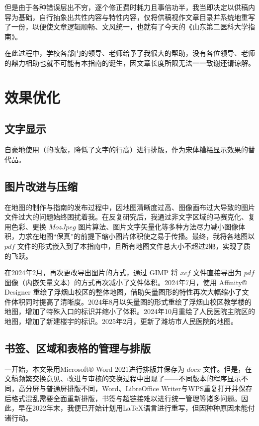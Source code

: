 但是由于各种错误层出不穷，逐个修正费时耗力且事倍功半，我当即决定以供稿内容为基础，自行抽象出共性内容与特性内容，仅将供稿视作文章目录并系统地重写了一份，以便使文章逻辑顺畅、文风统一，也就有了今天的《山东第二医科大学指南》。

在此过程中，学校各部门的领导、老师给予了我很大的帮助，没有各位领导、老师的鼎力相助也就不可能有本指南的诞生，因文章长度所限无法一一致谢还请谅解。

\section[效果优化]{效果优化}
\subsection[文字显示]{文字显示}
自豪地使用（的改版，降低了文字的行高）进行排版，作为宋体糟糕显示效果的替代品。

\subsection[图片改进与压缩]{图片改进与压缩}
在地图的制作与指南的发布过程中，因地图清晰度过高、图像画布过大导致的图片文件过大\footnotemark 的问题始终困扰着我。在反复研究后，我通过非文字区域的马赛克化、复用色彩、更换 $MozJpeg$ 图片算法、图片文字矢量化等多种方法尽力减小图像体积，力求在地图“保真”的前提下缩小图片体积使之易于传播。最终，我将各地图以 $pdf$ 文件的形式嵌入到了本指南中，且所有地图文件总大小不超过2㎆，实现了质的飞跃。

在2024年2月，再次更改导出图片的方式，通过 GIMP 将 $xcf$ 文件直接导出为 $pdf$ 图像（内嵌矢量文本）的方式再次减小了文件体积。2024年7月，使用 Affinity® Designer 重绘了浮烟山校区的整体地图，借助矢量图形的特性再次大幅缩小了文件体积同时提高了清晰度。2024年8月以矢量图的形式重绘了浮烟山校区教学楼的地图，增加了特殊入口的标识并缩小了体积。2024年10月重绘了人民医院主院区的地图，增加了新建楼宇的标识。2025年2月，更新了潍坊市人民医院的地图。

\subsection[书签、区域和表格的管理与排版]{书签、区域和表格的管理与排版}
一开始，本文采用Microsoft® Word 2021进行排版并保存为 $docx$ 文件。但是，在文稿频繁交换意见、改进与审核的交换过程中出现了——不同版本的程序显示不同，高分屏与普通屏排版不同，Word、LibreOffice Writer与WPS重复打开并保存后格式混乱需要全面重新排版，书签与超链接难以进行统一管理等诸多问题。因此，早在2022年末，我便已开始计划用\LaTeX 语言进行重写，但因种种原因未能付诸行动。

